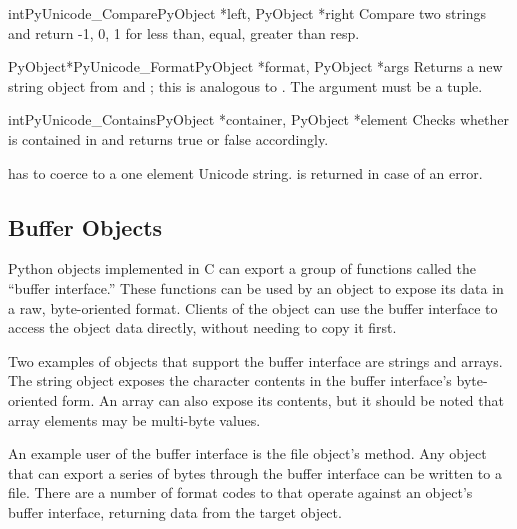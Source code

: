 \documentclass{manual}
\begin{document}
\begin{cfuncdesc}{int}{PyUnicode_Compare}{PyObject *left, PyObject *right}
Compare two strings and return -1, 0, 1 for less than, equal,
greater than resp.
\end{cfuncdesc}

\begin{cfuncdesc}{PyObject*}{PyUnicode_Format}{PyObject *format,
                                              PyObject *args}
Returns a new string object from  and ; this is
analogous to .  The
 argument must be a tuple.
\end{cfuncdesc}

\begin{cfuncdesc}{int}{PyUnicode_Contains}{PyObject *container,
                                           PyObject *element}
Checks whether  is contained in  and
returns true or false accordingly.

 has to coerce to a one element Unicode string.  is
returned in case of an error.
\end{cfuncdesc}


\subsection{Buffer Objects \label{bufferObjects}}

Python objects implemented in C can export a group of functions called
the ``buffer interface.''  These functions can
be used by an object to expose its data in a raw, byte-oriented
format. Clients of the object can use the buffer interface to access
the object data directly, without needing to copy it first.

Two examples of objects that support 
the buffer interface are strings and arrays. The string object exposes 
the character contents in the buffer interface's byte-oriented
form. An array can also expose its contents, but it should be noted
that array elements may be multi-byte values.

An example user of the buffer interface is the file object's
 method. Any object that can export a series of bytes
through the buffer interface can be written to a file. There are a
number of format codes to  that operate 
against an object's buffer interface, returning data from the target
object.
\end{document}
